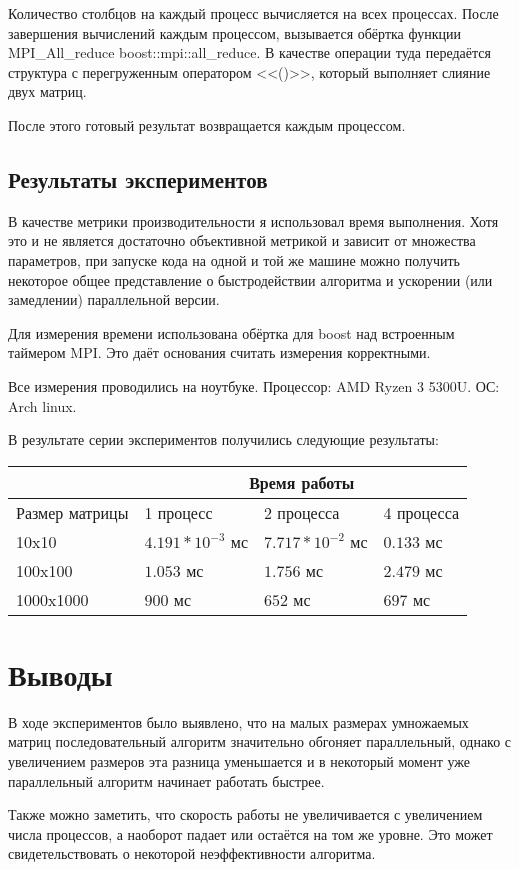 \documentclass[a4paper,12pt]{article}
\begin{document}
Количество столбцов на каждый процесс вычисляется на всех процессах. После завершения вычислений каждым процессом, вызывается обёртка функции MPI\_All\_reduce boost::mpi::all\_reduce. В качестве операции туда передаётся структура с перегруженным оператором <<()>>, который выполняет слияние двух матриц.

После этого готовый результат возвращается каждым процессом.

\subsection{Результаты экспериментов}
В качестве метрики производительности я использовал время выполнения. Хотя это и не является достаточно объективной метрикой и зависит от множества параметров, при запуске кода на одной и той же машине можно получить некоторое общее представление о быстродействии алгоритма и ускорении (или замедлении) параллельной версии.

Для измерения времени использована обёртка для boost над встроенным таймером MPI. Это даёт основания считать измерения корректными.

Все измерения проводились на ноутбуке. Процессор: AMD Ryzen 3 5300U. ОС: Arch linux.

В результате серии экспериментов получились следующие результаты:

\begin{tabular}{|p{3.5cm}|p{3cm}|p{3cm}|p{3cm}|}
 \hline
 & \multicolumn{3}{|c|}{Время работы}\\
 \hline
 Размер матрицы & 1 процесс & 2 процесса & 4 процесса\\
 \hline
 10x10 & $4.191*10^{-3}$ мс & $7.717*10^{-2}$ мс & $0.133$ мс\\
 \hline
 100x100 & $1.053$ мс & $1.756$ мс & $2.479$ мс\\
 \hline
 1000x1000 & $900$ мс & $652$ мс & $697$ мс\\
 \hline
\end{tabular}
\newpage
\section{Выводы}
В ходе экспериментов было выявлено, что на малых размерах умножаемых матриц последовательный алгоритм значительно обгоняет параллельный, однако с увеличением размеров эта разница уменьшается и в некоторый момент уже параллельный алгоритм начинает работать быстрее.

Также можно заметить, что скорость работы не увеличивается с увеличением числа процессов, а наоборот падает или остаётся на том же уровне. Это может свидетельствовать о некоторой неэффективности алгоритма.
\end{document}
